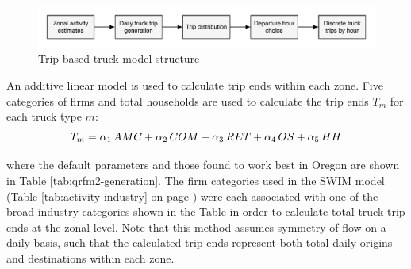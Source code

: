 \begin{figure}
\centering
\includegraphics[width=6in]{ct/ct-trip-model.pdf}
\caption{Trip-based truck model structure}
\label{fig:ct-trip-model}
\end{figure}

An additive linear model is used to calculate trip ends within each zone. Five categories of firms and total households are used to calculate the trip ends $T_m$ for each truck type $m$:
\begin{equation}
T_m = \alpha_1 \thinspace AMC + \alpha_2 \thinspace COM + \alpha_3 \thinspace RET + \alpha_4 \thinspace OS + \alpha_5 \thinspace HH
\end{equation}

\noindent where the default parameters and those found to work best in Oregon are shown in Table \ref{tab:qrfm2-generation}. The firm categories used in the SWIM model (Table \ref{tab:activity-industry} on page \pageref{tab:activity-industry}) were each associated with one of the broad industry categories shown in the Table in order to calculate total truck trip ends at the zonal level. Note that this method assumes symmetry of flow on a daily basis, such that the calculated trip ends represent both total daily origins and destinations within each zone.

